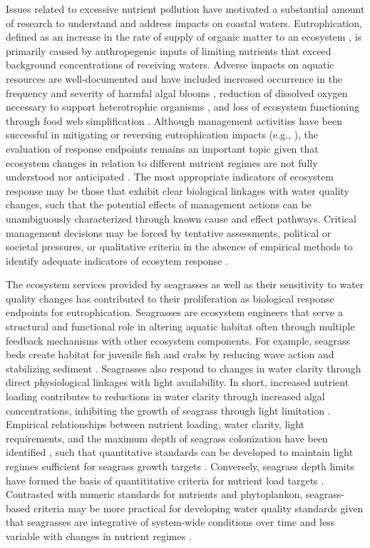 \documentclass[letterpaper,12pt,oneside]{article}\usepackage[]{graphicx}\usepackage[]{color}
\begin{document}
Issues related to excessive nutrient pollution have motivated a substantial amount of research to understand and address impacts on coastal waters.  Eutrophication, defined as an increase in the rate of supply of organic matter to an ecosystem \citep{Nixon95}, is primarily caused by anthropegenic inputs of limiting nutrients that exceed background concentrations of receiving waters.  Adverse impacts on aquatic resources are well-documented and have included increased occurrence in the frequency and severity of harmfal algal blooms \citep{Cloern96}, reduction of dissolved oxygen necessary to support heterotrophic organisms \citep{Justic87,Diaz08}, and loss of ecosystem functioning through food web simplification \citep{Tewfik07}. Although management activities have been successful in mitigating or reversing eutrophication impacts (e.g., \citealt{Greening06}), the evaluation of response endpoints remains an important topic given that ecosystem changes in relation to different nutrient regimes are not fully understood nor anticipated \citep{Duarte09}.  The most appropriate indicators of ecosystem response may be those that exhibit clear biological linkages with water quality changes, such that the potential effects of management actions can be unambiguously characterized through known cause and effect pathways.  Critical management decisions may be forced by tentative assessments, political or societal pressures, or qualitative criteria in the absence of empirical methods to identify adequate indicators of ecosytem response \citep{Duarte09}.  

The ecosystem services provided by seagrasses as well as their sensitivity to water quality changes has contributed to their proliferation as biological response endpoints for eutrophication.  Seagrasses are ecosystem engineers \citep{Jones94,Koch01} that serve a structural and functional role in altering aquatic habitat often through multiple feedback mechanisms with other ecosystem components.  For example, seagrass beds create habitat for juvenile fish and crabs by reducing wave action and stabilizing sediment \citep{williams01,Hughes09}.  Seagrasses also respond to changes in water clarity through direct physiological linkages with light availability.  In short, increased nutrient loading contributes to reductions in water clarity through increased algal concentrations, inhibiting the growth of seagrass through light limitation \citep{Duarte95}.  Empirical relationships between nutrient loading, water clarity, light requirements, and the maximum depth of seagrass colonization have been identified \citep{Duarte91,Kenworthy96,Choice14}, such that quantitative standards can be developed to maintain light regimes sufficient for seagrass growth targets \citep{Steward05}.  Conversely, seagrass depth limits have formed the basis of quantititative criteria for nutrient load targets \citep{Janicki96}.  Contrasted with numeric standards for nutrients and phytoplankon, seagrass-based criteria may be more practical for developing water quality standards given that seagrasses are integrative of system-wide conditions over time and less variable with changes in nutrient regimes \citep{Duarte95}.  
\end{document}
